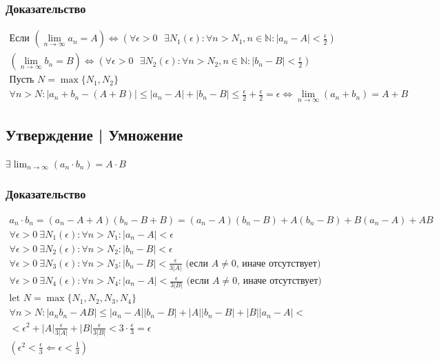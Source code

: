 \documentclass{article}
\begin{document}
\subsubsection{Доказательство}
\begin{gather*}
	\text{Если } (\lim_{n \to \infty} a_n = A) \Leftrightarrow (\forall \epsilon > 0 \text{ } \exists N_1(\epsilon): \forall n > N_1, n \in \mathbb{N} : |a_n - A| < \frac{\epsilon}{2}) \\
	(\lim_{n \to \infty} b_n = B) \Leftrightarrow (\forall \epsilon > 0 \text{ } \exists N_2(\epsilon): \forall n > N_2, n \in \mathbb{N} : |b_n - B| < \frac{\epsilon}{2}) \\
	\text{Пусть } N = \max\{N_1, N_2\} \\
	\forall n > N : |a_n + b_n - (A + B)| \le |a_n - A| + |b_n - B| \le \frac{\epsilon}{2} + \frac{\epsilon}{2} = \epsilon \Leftrightarrow \lim_{n \to \infty} (a_n + b_n) = A + B
\end{gather*}


\subsection{Утверждение | Умножение}
$\exists \lim_{n \to \infty} (a_n \cdot b_n) = A \cdot B$

\subsubsection{Доказательство}
\begin{gather*}
	a_n \cdot b_n = (a_n - A + A)(b_n - B + B) = (a_n - A)(b_n - B) + A(b_n - B) + B(a_n - A) + AB \\
	\forall \epsilon > 0 ~ \exists N_1(\epsilon): \forall n > N_1 : |a_n - A| < \epsilon \\
	\forall \epsilon > 0 ~ \exists N_2(\epsilon): \forall n > N_2 : |b_n - B| < \epsilon \\
	\forall \epsilon > 0 ~ \exists N_3(\epsilon): \forall n > N_3 : |b_n - B| < \frac{\epsilon}{3|A|} \text{ (если $A \neq 0$, иначе отсутствует)} \\
	\forall \epsilon > 0 ~ \exists N_4(\epsilon): \forall n > N_4 : |a_n - A| < \frac{\epsilon}{3|B|} \text{ (если $A \neq 0$, иначе отсутствует)} \\
	\text{let } N = \max\{N_1, N_2, N_3, N_4\} \\
	\forall n > N: |a_n b_n - AB| \le |a_n - A||b_n - B| + |A||b_n - B| + |B||a_n - A| < \\
	< \epsilon^2 + |A| \frac{\epsilon}{3|A|} + |B| \frac{\epsilon}{3|B|} < 3 \cdot \frac{\epsilon}{3} = \epsilon \\
	(\epsilon^2 < \frac{\epsilon}{3} \Leftarrow \epsilon < \frac{1}{3})
\end{gather*}
\end{document}
